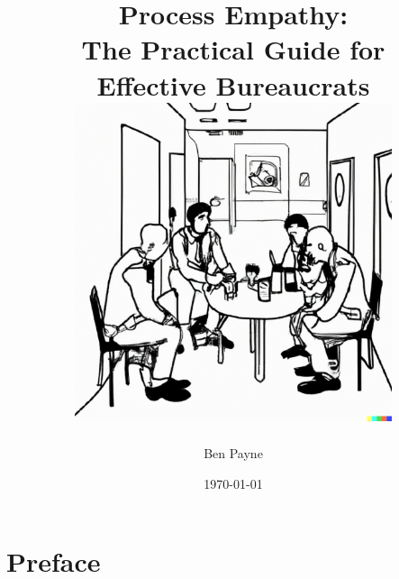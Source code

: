 \documentclass[openright]{book} %
\title{\huge{Process Empathy:\\
The Practical Guide for\\ Effective Bureaucrats}\\
\vfill
\includegraphics[width=0.7\textwidth]{images/bureaucrat_empathizing_with_coworkers_in_office_breakroom.pdf}
}
\author{\huge Ben Payne}
\date{\today}
\begin{document}






\begin{titlepage}
\iftoggle{printedonpaper}{}{\maketitle}
\thispagestyle{empty}
\end{titlepage}
\clearpage





\frontmatter %

\clearpage

\iftoggle{showminitoc}{\dominitoc}{} %
\hypertarget{contents}{}
\tableofcontents\label{sec:toc}

\chapter*{Preface}%
\end{document}

